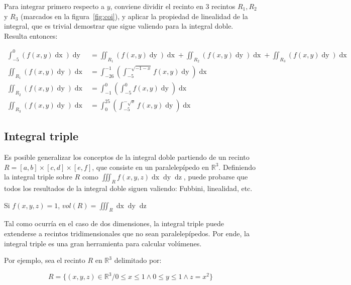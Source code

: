 \documentclass{article}
\renewcommand{\Bbb}{\mathbb}
\begin{document}
\begin{enumerate}[(A)]
Para integrar primero respecto a $y$, conviene dividir el recinto en 3 recintos $R_1, R_2$ y $R_3$ (marcados en la figura~\ref{fig:coi}), y aplicar la propiedad de linealidad de la integral, que es trivial demostrar que sigue valiendo para la integral doble. Resulta entonces:

\begin{align}
\int_{-5}^0 \left( f(x,y) \mathop{dx} \right) \mathop{dy} &= \iint_{R_1} (f(x,y) \mathop{dy}) \mathop{dx} + \iint_{R_2} (f(x,y) \mathop{dy}) \mathop{dx} + \iint_{R_3} (f(x,y) \mathop{dy}) \mathop{dx} \\
\iint_{R_1} (f(x,y) \mathop{dy}) \mathop{dx} &= \int_{-26}^{-1} \left( \int_{-5}^{-\sqrt{-1-x}} f(x,y) \mathop{dy}  \right) \mathop{dx} \\
\iint_{R_2} (f(x,y) \mathop{dy}) \mathop{dx} &= \int_{-1}^{0} \left( \int_{-5}^0 f(x,y) \mathop{dy} \right) \mathop{dx} \\
\iint_{R_3} (f(x,y) \mathop{dy}) \mathop{dx} &= \int_{0}^{25} \left( \int_{-5}^{-\sqrt{x}} f(x,y) \mathop{dy} \right) \mathop{dx}
\end{align}

\end{enumerate}

\subsection{Integral triple}

Es posible generalizar los conceptos de la integral doble partiendo de un recinto $R = [a,b] \times [c,d] \times [e,f]$, que consiste en un paralelepípedo en $\Bbb R^3$. Definiendo la integral triple sobre $R$ como $\iiint_R f(x,y,z) \mathop{dx} \mathop{dy} \mathop{dz}$, puede probarse que todos los resultados de la integral doble siguen valiendo: Fubbini, linealidad, etc.

Si $f(x,y,z) = 1$, $vol(R) = \iiint_R \mathop{dx} \mathop{dy} \mathop{dz}$

Tal como ocurría en el caso de dos dimensiones, la integral triple puede extenderse a recintos tridimensionales que no sean paralelepípedos. Por ende, la integral triple es una gran herramienta para calcular volúmenes.

Por ejemplo, sea el recinto $R$ en $\Bbb R^3$ delimitado por:

\begin{equation}
R = \{ (x,y,z) \in \Bbb R^3 / 0 \leq x \leq 1 \wedge 0 \leq y \leq 1 \wedge z = x^2 \}
\end{equation}
\end{document}
